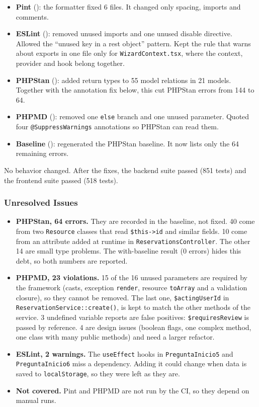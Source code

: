 \begin{itemize}[nosep]
  \item \textbf{Pint} (): the formatter fixed 6 files. It changed only spacing, imports and comments.
  \item \textbf{ESLint} (): removed unused imports and one unused disable directive.
        Allowed the ``unused key in a rest object'' pattern.
        Kept the rule that warns about exports in one file only for \texttt{WizardContext.tsx}, where the context, provider and hook belong together.
  \item \textbf{PHPStan} (): added return types to 55 model relations in 21 models.
        Together with the annotation fix below, this cut PHPStan errors from 144 to 64.
  \item \textbf{PHPMD} (): removed one \texttt{else} branch and one unused parameter.
        Quoted four \texttt{@SuppressWarnings} annotations so PHPStan can read them.
  \item \textbf{Baseline} (): regenerated the PHPStan baseline. It now lists only the 64 remaining errors.
\end{itemize}

No behavior changed.
After the fixes, the backend suite passed (851 tests) and the frontend suite passed (518 tests).

\subsubsection*{Unresolved Issues}

\begin{itemize}[nosep]
  \item \textbf{PHPStan, 64 errors.}
        They are recorded in the baseline, not fixed.
        40 come from two \texttt{Resource} classes that read \texttt{\$this->id} and similar fields.
        10 come from an attribute added at runtime in \texttt{ReservationsController}.
        The other 14 are small type problems.
        The with-baseline result (0 errors) hides this debt, so both numbers are reported.
  \item \textbf{PHPMD, 23 violations.}
        15 of the 16 unused parameters are required by the framework (casts, exception \texttt{render}, resource \texttt{toArray} and a validation closure), so they cannot be removed.
        The last one, \texttt{\$actingUserId} in \texttt{ReservationService::create()}, is kept to match the other methods of the service.
        3 undefined variable reports are false positives: \texttt{\$requiresReview} is passed by reference.
        4 are design issues (boolean flags, one complex method, one class with many public methods) and need a larger refactor.
  \item \textbf{ESLint, 2 warnings.}
        The \texttt{useEffect} hooks in \texttt{PreguntaInicio5} and \texttt{PreguntaInicio6} miss a dependency.
        Adding it could change when data is saved to \texttt{localStorage}, so they were left as they are.
  \item \textbf{Not covered.}
        Pint and PHPMD are not run by the CI, so they depend on manual runs.
\end{itemize}
